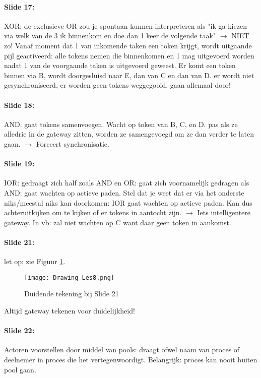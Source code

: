 \documentclass[10pt,a4paper]{report}
\begin{document}
\paragraph{Slide 17:}XOR: de exclusieve OR zou je spontaan kunnen interpreteren als "ik ga kiezen via welk van de 3 ik binnenkom en doe dan 1 keer de volgende taak" $\rightarrow$ NIET zo! Vanaf moment dat 1 van inkomende taken een token krijgt, wordt uitgaande pijl geactiveerd: alle tokens nemen die binnenkomen en 1 mag uitgevoerd worden nadat 1 van de voorgaande taken is uitgevoerd geweest. Er komt een token binnen via B, wordt doorgesluisd naar E, dan van C en dan van D. er wordt niet gesynchroniseerd, er worden geen tokens weggegooid, gaan allemaal door!

\paragraph{Slide 18:}AND: gaat tokens samenvoegen. Wacht op token van B, C, en D. pas als ze alledrie in de gateway zitten, worden ze samengevoegd om ze dan verder te laten gaan. $\rightarrow$ Forceert synchronisatie.

\paragraph{Slide 19:}IOR: gedraagt zich half zoals AND en OR: gaat zich voornamelijk gedragen als AND: gaat wachten op actieve paden. Stel dat je weet dat er via het onderste niks/meestal niks kan doorkomen: IOR gaat wachten op actieve paden. Kan dus achteruitkijken om te kijken of er tokens in aantocht zijn. $\rightarrow$ Iets intelligentere gateway. In vb: zal niet wachten op C want daar geen token in aankomst.

\paragraph{Slide 21:} let op: zie Figuur \ref{Drawing_Les 8}.
\begin{figure}[ht!]
\centering
\texttt{[image: Drawing\_Les8.png]}
\caption{Duidende tekening bij Slide 21 \label{Drawing_Les 8}}
\end{figure}

Altijd gateway tekenen voor duidelijkheid!

\paragraph{Slide 22:}Actoren voorstellen door middel van pools: draagt ofwel naam van proces of deelnemer in proces die het vertegenwoordigt. Belangrijk: proces kan nooit buiten pool gaan.
\end{document}

